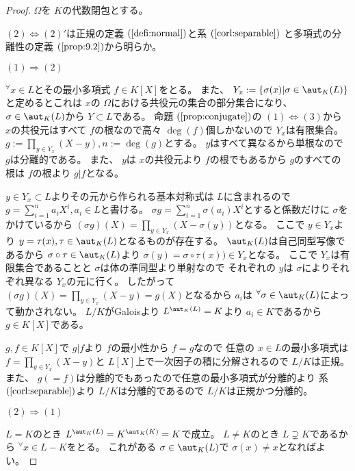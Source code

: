 \documentclass[../master_galois_theory]{subfiles}
\begin{document}
\begin{proof}
  $\Omega$を $K$の代数閉包とする。

  $(2) \Leftrightarrow (2)'$は正規の定義 $(\mathrm{\ref{defi:normal}})$と系 $(\mathrm{\ref{corl:separable}})$
  と多項式の分離性の定義 $(\mathrm{\ref{prop:9.2}})$から明らか。

  $(1) \Rightarrow (2)$

  ${}^\forall x \in L$とその最小多項式 $f \in K[X]$をとる。
  また、 $Y_x := \{ \sigma(x) | \sigma \in \aut_K(L) \}$
  と定めるとこれは $x$の $\Omega$における共役元の集合の部分集合になり、
  $\sigma \in \aut_K(L)$から $Y \subset L$である。
  命題 $(\mathrm{\ref{prop:conjugate}})$の $(1) \Leftrightarrow (3)$から
  $x$の共役元はすべて $f$の根なので高々 $\deg(f)$個しかないので $Y_x$は有限集合。
  $g := \prod_{y \in Y_x}(X - y) , n := \deg(g)$とする。
  $y$はすべて異なるから単根なので $g$は分離的である。
  また、 $y$は $x$の共役元より $f$の根でもあるから $g$のすべての根は $f$の根より
  $g|f$となる。

  $y \in Y_x \subset L$よりその元から作られる基本対称式は $L$に含まれるので
  $g = \sum_{i=1}^n a_i X^i , a_i \in L$と書ける。
  $\sigma g = \sum_{i=1}^n \sigma(a_i) X^i$とすると係数だけに $\sigma$をかけているから $(\sigma g)(X) = \prod_{y \in Y_x}(X - \sigma(y))$となる。
  ここで $y \in Y_x$より $y = \tau(x) , \tau \in \aut_K(L)$となるものが存在する。
  $\aut_K(L)$は自己同型写像であるから $\sigma \circ \tau \in \aut_K(L)$より $\sigma(y) = \sigma \circ \tau(x)) \in Y_x$となる。
  ここで $Y_x$は有限集合であることと $\sigma$は体の準同型より単射なので
  それぞれの $y$は $\sigma$によりそれぞれ異なる $Y_x$の元に行く。
  したがって $(\sigma g)(X) = \prod_{y \in Y_x}(X - y) = g(X)$となるから
  $a_i$は ${}^\forall \sigma \in \aut_K(L)$によって動かされない。
  $L/K$が\rm{Galois}より $L^{\aut_K(L)} = K$より $a_i \in K$であるから
  $g \in K[X]$である。

  $g , f \in K[X]$で $g|f$より $f$の最小性から $f = g$なので
  任意の $x \in L$の最小多項式は
  $f = \prod_{y \in Y_x}(X - y)$と $L[X]$上で一次因子の積に分解されるので
  $L/K$は正規。
  また、 $g (= f)$は分離的でもあったので任意の最小多項式が分離的より
  系 $(\mathrm{\ref{corl:separable}})$より $L/K$は分離的であるので
  $L/K$は正規かつ分離的。

  $(2) \Rightarrow (1)$

  $L = K$のとき $L^{\aut_K(L)} = K^{\aut_K(K)} = K$で成立。
  $L \neq K$のとき $L \supsetneq K$であるから ${}^\forall x \in L - K$をとる。
  これがある $\sigma \in \aut_K(L)$で $\sigma(x) \neq x$となればよい。


\end{proof}
\end{document}
